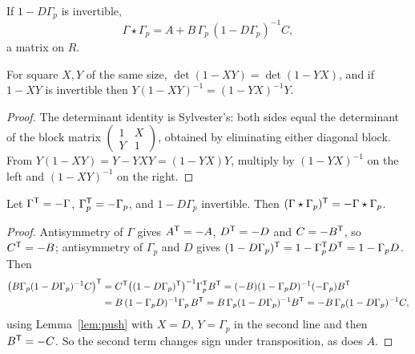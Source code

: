\begin{definition}[Contraction]\label{def:contract}
If $1-D\Gamma_p$ is invertible,
\[
 \Gamma\star\Gamma_p=A+B\,\Gamma_p\,(1-D\Gamma_p)^{-1}C ,
\]
a matrix on $R$.
\end{definition}

\begin{lemma}\label{lem:push}
For square $X,Y$ of the same size, $\det(1-XY)=\det(1-YX)$, and if $1-XY$ is invertible
then $Y(1-XY)^{-1}=(1-YX)^{-1}Y$.
\end{lemma}
\begin{proof}
The determinant identity is Sylvester's: both sides equal the determinant of the block
matrix $\begin{pmatrix}1&X\\Y&1\end{pmatrix}$, obtained by eliminating either diagonal
block. From $Y(1-XY)=Y-YXY=(1-YX)Y$, multiply by $(1-YX)^{-1}$ on the left and
$(1-XY)^{-1}$ on the right.
\end{proof}

\begin{theorem}[Antisymmetry]\label{thm:antisym}
Let $\Gamma^{\mathsf T}=-\Gamma$, $\Gamma_p^{\mathsf T}=-\Gamma_p$, and $1-D\Gamma_p$ invertible. Then
$(\Gamma\star\Gamma_p)^{\mathsf T}=-\Gamma\star\Gamma_p$.
\end{theorem}
\begin{proof}
Antisymmetry of $\Gamma$ gives $A^{\mathsf T}=-A$, $D^{\mathsf T}=-D$ and $C=-B^{\mathsf T}$, so
$C^{\mathsf T}=-B$; antisymmetry of $\Gamma_p$ and $D$ gives
$(1-D\Gamma_p)^{\mathsf T}=1-\Gamma_p^{\mathsf T}D^{\mathsf T}=1-\Gamma_pD$. Then
\begin{align*}
 \bigl(B\Gamma_p(1-D\Gamma_p)^{-1}C\bigr)^{\mathsf T}
 &=C^{\mathsf T}\bigl((1-D\Gamma_p)^{\mathsf T}\bigr)^{-1}\Gamma_p^{\mathsf T}B^{\mathsf T}
 =(-B)(1-\Gamma_pD)^{-1}(-\Gamma_p)B^{\mathsf T}\\
 &=B\,(1-\Gamma_pD)^{-1}\Gamma_p\,B^{\mathsf T}
 =B\,\Gamma_p(1-D\Gamma_p)^{-1}B^{\mathsf T}
 =-B\,\Gamma_p(1-D\Gamma_p)^{-1}C ,
\end{align*}
using Lemma~\ref{lem:push} with $X=D$, $Y=\Gamma_p$ in the second line and then
$B^{\mathsf T}=-C$. So the second term changes sign under transposition, as does $A$.
\end{proof}

